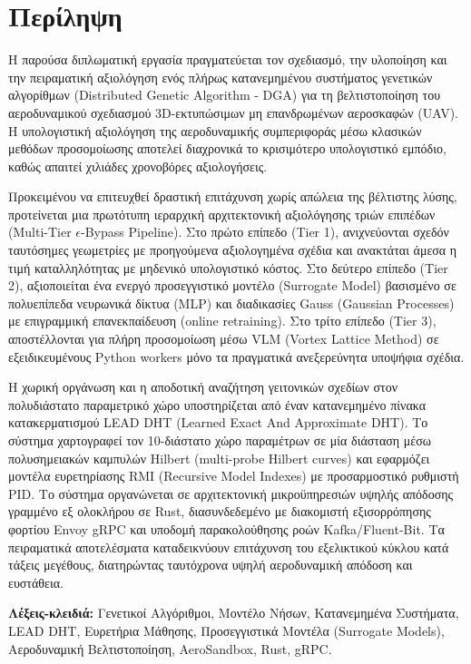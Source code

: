 
\chapter*{Περίληψη}

Η παρούσα διπλωματική εργασία πραγματεύεται τον σχεδιασμό, την υλοποίηση και την πειραματική αξιολόγηση ενός πλήρως κατανεμημένου συστήματος γενετικών αλγορίθμων (Distributed Genetic Algorithm - DGA) για τη βελτιστοποίηση του αεροδυναμικού σχεδιασμού 3D-εκτυπώσιμων μη επανδρωμένων αεροσκαφών (UAV). Η υπολογιστική αξιολόγηση της αεροδυναμικής συμπεριφοράς μέσω κλασικών μεθόδων προσομοίωσης αποτελεί διαχρονικά το κρισιμότερο υπολογιστικό εμπόδιο, καθώς απαιτεί χιλιάδες χρονοβόρες αξιολογήσεις.

Προκειμένου να επιτευχθεί δραστική επιτάχυνση χωρίς απώλεια της βέλτιστης λύσης, προτείνεται μια πρωτότυπη ιεραρχική αρχιτεκτονική αξιολόγησης τριών επιπέδων (Multi-Tier $\epsilon$-Bypass Pipeline). Στο πρώτο επίπεδο (Tier 1), ανιχνεύονται σχεδόν ταυτόσημες γεωμετρίες με προηγούμενα αξιολογημένα σχέδια και ανακτάται άμεσα η τιμή καταλληλότητας με μηδενικό υπολογιστικό κόστος. Στο δεύτερο επίπεδο (Tier 2), αξιοποιείται ένα ενεργό προσεγγιστικό μοντέλο (Surrogate Model) βασισμένο σε πολυεπίπεδα νευρωνικά δίκτυα (MLP) και διαδικασίες Gauss (Gaussian Processes) με επιγραμμική επανεκπαίδευση (online retraining). Στο τρίτο επίπεδο (Tier 3), αποστέλλονται για πλήρη προσομοίωση μέσω VLM (Vortex Lattice Method) σε εξειδικευμένους Python workers μόνο τα πραγματικά ανεξερεύνητα υποψήφια σχέδια.

Η χωρική οργάνωση και η αποδοτική αναζήτηση γειτονικών σχεδίων στον πολυδιάστατο παραμετρικό χώρο υποστηρίζεται από έναν κατανεμημένο πίνακα κατακερματισμού LEAD DHT (Learned Exact And Approximate DHT). Το σύστημα χαρτογραφεί τον 10-διάστατο χώρο παραμέτρων σε μία διάσταση μέσω πολυσημειακών καμπυλών Hilbert (multi-probe Hilbert curves) και εφαρμόζει μοντέλα ευρετηρίασης RMI (Recursive Model Indexes) με προσαρμοστικό ρυθμιστή PID. Το σύστημα οργανώνεται σε αρχιτεκτονική μικροϋπηρεσιών υψηλής απόδοσης γραμμένο εξ ολοκλήρου σε Rust, διασυνδεδεμένο με διακομιστή εξισορρόπησης φορτίου Envoy gRPC και υποδομή παρακολούθησης ροών Kafka/Fluent-Bit. Τα πειραματικά αποτελέσματα καταδεικνύουν επιτάχυνση του εξελικτικού κύκλου κατά τάξεις μεγέθους, διατηρώντας ταυτόχρονα υψηλή αεροδυναμική απόδοση και ευστάθεια.

\vspace{1.2cm}

\noindent \textbf{Λέξεις-κλειδιά:} Γενετικοί Αλγόριθμοι, Μοντέλο Νήσων, Κατανεμημένα Συστήματα, LEAD DHT, Ευρετήρια Μάθησης, Προσεγγιστικά Μοντέλα (Surrogate Models), Αεροδυναμική Βελτιστοποίηση, AeroSandbox, Rust, gRPC.

\clearpage
